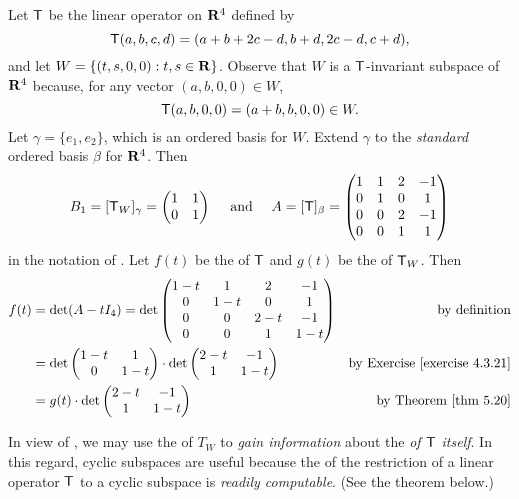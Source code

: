 \begin{example} \label{example 5.4.5}
Let \(\textsf{T}\) be the linear operator on \(\mathbf{R}^4\) defined by
\[
    \textsf{T}(a, b, c, d) = (a + b + 2c - d, b + d, 2c - d, c + d),
\]
and let \(W = \{ (t, s, 0, 0) : t, s \in \mathbf{R} \}\).
Observe that \(W\) is a \(\textsf{T}\)-invariant subspace of \(\mathbf{R}^4\) because, for any vector \((a, b, 0, 0) \in W\),
\[
    \textsf{T}(a, b, 0, 0) = (a + b, b, 0, 0) \in W.
\]
Let \(\gamma = \{ e_1, e_2 \}\), which is an ordered basis for \(W\).
Extend \(\gamma\) to the \emph{standard} ordered basis \(\beta\) for \(\mathbf{R}^4\).
Then
\[
    B_1 = [\textsf{T}_W]_{\gamma} = \begin{pmatrix} 1 & 1 \\ 0 & 1 \end{pmatrix}
    \quad \text{ and } \quad
    A = [\textsf{T}]_{\beta} = \begin{pmatrix} 1 & 1 & 2 & -1 \\ 0 & 1 & 0 & 1 \\ 0 & 0 & 2 & -1 \\ 0 & 0 & 1 & 1 \end{pmatrix}
\]
in the notation of .
Let \(f(t)\) be the \CPOLY{} of \(\textsf{T}\) and \(g(t)\) be the \CPOLY{} of \(\textsf{T}_W\).
Then
\begin{align*}
    f(t) & = \det(A - tI_4) = \det \begin{pmatrix} 1-t & 1 & 2 & -1 \\ 0 & 1-t & 0 & 1 \\ 0 & 0 & 2-t & -1 \\ 0 & 0 & 1 & 1-t \end{pmatrix} & \text{by definition} \\
         & = \det \begin{pmatrix} 1-t & 1 \\ 0 & 1-t \end{pmatrix} \cdot \det \begin{pmatrix} 2-t & -1 \\ 1 & 1-t \end{pmatrix} & \text{by \EXEC{4.3.21}} \\
         & = g(t) \cdot \det \begin{pmatrix} 2-t & -1 \\ 1 & 1-t \end{pmatrix} & \text{by \THM{5.20}}
\end{align*}
\end{example}

\begin{remark} \label{remark 5.4.3}
In view of , we may use the \CPOLY{} of \(T_W\) to \emph{gain information} about the \CPOLY{} \emph{of \(\textsf{T}\) itself}.
In this regard, cyclic subspaces are useful because the \CPOLY{} of the restriction of a linear operator \(\textsf{T}\) to a cyclic subspace is \emph{readily computable}.
(See the theorem below.)
\end{remark}

